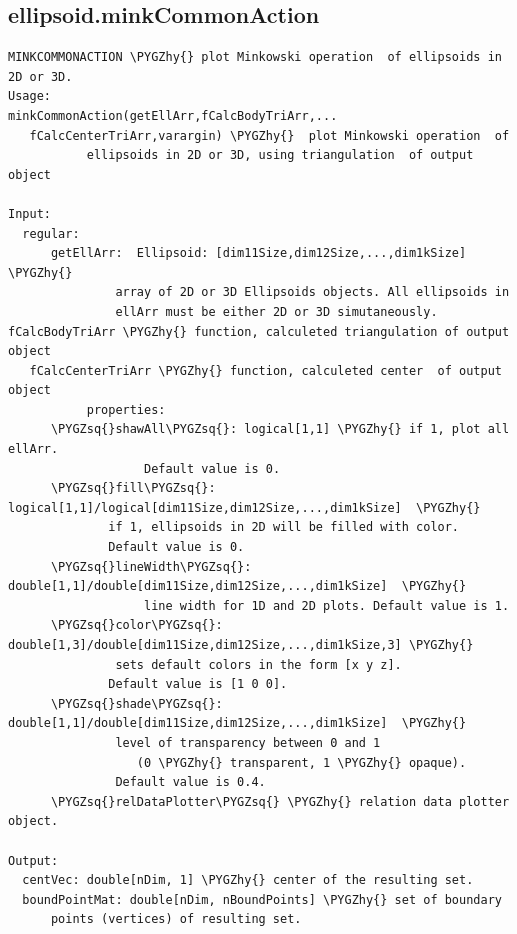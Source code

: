 \documentclass[letterpaper,10pt,english]{sphinxmanual}
\def\PYGZhy{\char`\-}
\def\PYGZsq{\char`\'}
\begin{document}
\subsection{ellipsoid.minkCommonAction}
\label{chap_functions:ellipsoid-minkcommonaction}
\begin{Verbatim}[commandchars=\\\{\}]
MINKCOMMONACTION \PYGZhy{} plot Minkowski operation  of ellipsoids in 2D or 3D.
Usage:
minkCommonAction(getEllArr,fCalcBodyTriArr,...
   fCalcCenterTriArr,varargin) \PYGZhy{}  plot Minkowski operation  of
           ellipsoids in 2D or 3D, using triangulation  of output object

Input:
  regular:
      getEllArr:  Ellipsoid: [dim11Size,dim12Size,...,dim1kSize] \PYGZhy{}
               array of 2D or 3D Ellipsoids objects. All ellipsoids in
               ellArr must be either 2D or 3D simutaneously.
fCalcBodyTriArr \PYGZhy{} function, calculeted triangulation of output object
   fCalcCenterTriArr \PYGZhy{} function, calculeted center  of output object
           properties:
      \PYGZsq{}shawAll\PYGZsq{}: logical[1,1] \PYGZhy{} if 1, plot all ellArr.
                   Default value is 0.
      \PYGZsq{}fill\PYGZsq{}: logical[1,1]/logical[dim11Size,dim12Size,...,dim1kSize]  \PYGZhy{}
              if 1, ellipsoids in 2D will be filled with color.
              Default value is 0.
      \PYGZsq{}lineWidth\PYGZsq{}: double[1,1]/double[dim11Size,dim12Size,...,dim1kSize]  \PYGZhy{}
                   line width for 1D and 2D plots. Default value is 1.
      \PYGZsq{}color\PYGZsq{}: double[1,3]/double[dim11Size,dim12Size,...,dim1kSize,3] \PYGZhy{}
               sets default colors in the form [x y z].
              Default value is [1 0 0].
      \PYGZsq{}shade\PYGZsq{}: double[1,1]/double[dim11Size,dim12Size,...,dim1kSize]  \PYGZhy{}
               level of transparency between 0 and 1
                  (0 \PYGZhy{} transparent, 1 \PYGZhy{} opaque).
               Default value is 0.4.
      \PYGZsq{}relDataPlotter\PYGZsq{} \PYGZhy{} relation data plotter object.

Output:
  centVec: double[nDim, 1] \PYGZhy{} center of the resulting set.
  boundPointMat: double[nDim, nBoundPoints] \PYGZhy{} set of boundary
      points (vertices) of resulting set.
\end{Verbatim}
\end{document}
